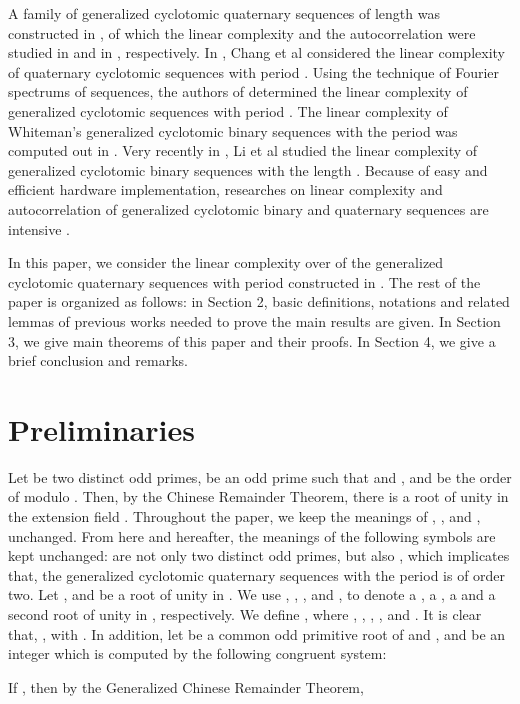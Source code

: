 \documentclass{mcom-l}
\theoremstyle{definition}
\numberwithin{equation}{section}
\begin{document}
A family of generalized cyclotomic quaternary sequences of length  was constructed in \cite{B11}, of which the linear complexity and the autocorrelation were studied in \cite{B10} and in \cite{B12}, respectively. In \cite{B13}, Chang et al  considered the linear complexity of quaternary cyclotomic sequences with period .  Using the technique of Fourier spectrums of  sequences, the authors of \cite{B14} determined the linear complexity of generalized cyclotomic sequences with period . The linear complexity of Whiteman\textquoteright s generalized cyclotomic binary sequences with the period  was computed out in \cite{B20}. Very recently in \cite[June 2015]{B21}, Li et al studied the linear complexity of generalized cyclotomic binary sequences with the length . Because of easy and efficient hardware implementation, researches on  linear complexity and autocorrelation of generalized cyclotomic binary and quaternary sequences are intensive \cite{B7,B8,B9,B15,B16,B17}.

 In this paper, we consider the linear complexity over  of the generalized cyclotomic quaternary sequences with period  constructed in \cite{B13}. The rest of the paper is organized as follows: in Section 2, basic definitions, notations  and related  lemmas of previous works needed to prove the main results are given. In Section 3, we give main theorems of this paper and their proofs. In Section 4, we give a brief conclusion and remarks.
 
 \section{Preliminaries}
 Let  be two distinct odd primes,  be an odd prime such that  and ,  and  be the order of  modulo . Then, by the Chinese Remainder Theorem, there is a  root of unity in the extension field . Throughout the paper, we keep the meanings of , , and , unchanged. From here and hereafter, the meanings of the following symbols are kept unchanged:  are not only two distinct odd primes, but also , which implicates that, the generalized cyclotomic quaternary sequences with the period  is of order two. Let , and  be a  root of unity in . We use , , , and , to denote a , a , a  and a second root of unity in , respectively. We define ,  where , , , , and . It is clear that, , with . In addition, let  be a common odd primitive root of  and , and  be an integer which is computed by the following congruent system:
 
 If , then by the Generalized Chinese Remainder Theorem, 
 
\end{document}
